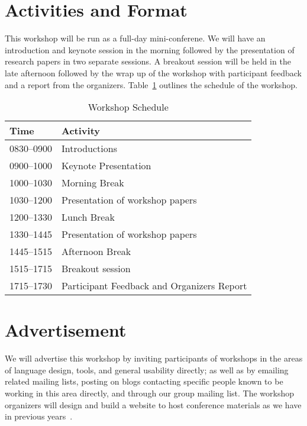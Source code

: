 \documentclass{sigplanconf}
\begin{document}
\section{Activities and Format}

This workshop will be run as a full-day mini-conferene.  We
will have an introduction and keynote session in the morning followed
by the presentation of research papers in two separate sessions. A breakout session will be held in the late afternoon followed by the wrap up of the workshop with participant feedback and a report from the organizers. Table~\ref{tab:schedule} outlines the schedule of the workshop.


\begin{table} [!htbp] %
\begin{tabularx}{\columnwidth}{|l|X|}
\hline
\textbf{Time}   & \textbf{Activity} \\
\hline
0830--0900    & Introductions \vspace{1mm} \\
0900--1000    & Keynote Presentation \vspace{1mm} \\
1000--1030    & Morning Break~\vspace{1mm}\\
1030--1200    & Presentation of workshop papers \vspace{1mm}\\
1200--1330    & Lunch Break~\vspace{1mm}\\
1330--1445   & Presentation of workshop papers \vspace{1mm}\\
1445--1515    & Afternoon Break~\vspace{1mm}\\
1515--1715    & Breakout session \vspace{1mm}\\
1715--1730    & Participant Feedback and Organizers Report  \\
\end{tabularx}
\caption{Workshop Schedule}
\label{tab:schedule}
\end{table}


\section{Advertisement}

We will advertise this workshop by inviting participants of workshops
in the areas of language design, tools, and general usability
directly; as well as by emailing related mailing lists, posting on
blogs contacting specific people known to be working in this area directly,
and through our group mailing list. The workshop organizers will design and build a website to host conference materials as we have in previous years~\cite{website-sites,website-vuw}.
\end{document}
